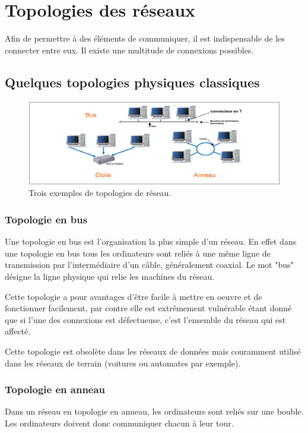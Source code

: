 \documentclass[11pt]{article}
\begin{document}
\section{Topologies des réseaux}
Afin de permettre à des éléments de communiquer, il est indispensable de les connecter entre eux. Il existe une multitude de connexions possibles.

\subsection{Quelques topologies physiques classiques}
\begin{figure}[h!t]
  \centering
  \includegraphics[width=.7\textwidth]{Src/Images/reseau_topologies}
  \caption{Trois exemples de topologies de réseau.}
  \label{fig:res_topo}
\end{figure}
\subsubsection{Topologie en bus}
Une topologie en bus est l'organisation la plus simple d'un réseau. En effet dans une topologie en bus tous les ordinateurs sont reliés à une même ligne de transmission par l'intermédiaire d'un câble, généralement coaxial. Le mot "bus" désigne la ligne physique qui relie les machines du réseau.

Cette topologie a pour avantages d'être {facile à mettre en oeuvre} et de fonctionner facilement, par contre elle est extrêmement {vulnérable} étant donné que si l'une des connexions est défectueuse, c'est l'ensemble du réseau qui est affecté.

Cette topologie est obsolète dans les réseaux de données mais couramment utilisé dans les réseaux de terrain (voitures ou automates par exemple).

\subsubsection{Topologie en anneau}
Dans un réseau en topologie en anneau, les ordinateurs sont reliés sur une bouble. Les ordinateurs doivent donc communiquer chacun à leur tour.
\end{document}

